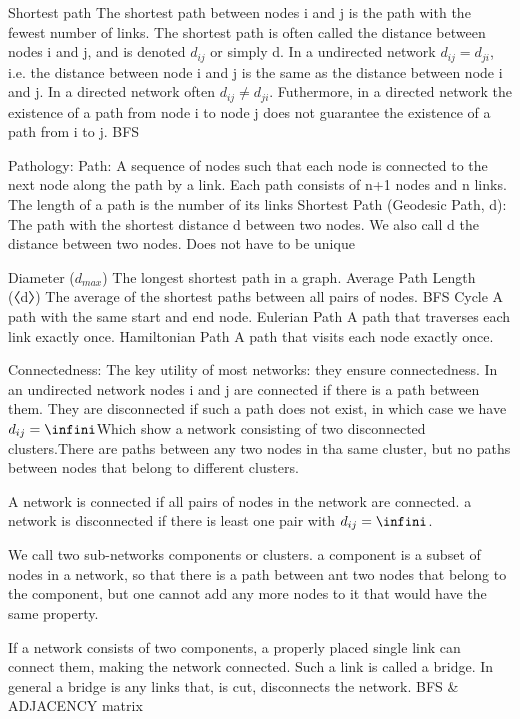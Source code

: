 Shortest path  
    The shortest path between nodes i and j is the path with the fewest number of links. The shortest path is often called the distance between nodes i and j, and is denoted $d_{ij}$ or simply d. 
    In a undirected network $d_{ij}=d_{ji}$, i.e. the distance between node i and j is the same as the distance between node i and j. In a directed network often $d_{ij} \neq d_{ji}$. Futhermore, in a directed network the existence of a path from node i to node j does not guarantee the existence of a path from i to j. BFS

Pathology: 
    Path: 
        A sequence of nodes such that each node is connected to the next node along the path by a link. Each path consists of n+1 nodes and n links. The length of a path is the number of its links
    Shortest Path (Geodesic Path, d):  
        The path with the shortest distance d between two nodes. We also call d the distance between two nodes. Does not have to be unique 
    
    Diameter ($d_{max}$)
        The longest shortest path in a graph.
    Average Path Length (〈d〉)
        The average of the shortest paths between all pairs of nodes. BFS 
    Cycle
        A path with the same start and end node. 
    Eulerian Path
        A path that traverses each link exactly once. 
    Hamiltonian Path
        A path that visits each node exactly once. 
        

Connectedness: 
    The key utility of most networks: they ensure connectedness. 
    In an undirected network nodes i and j are connected if there is a path between them. They are disconnected if such a path does not exist, in which case we have $d_{ij}=\infini $Which show a network consisting of two disconnected clusters.There are paths between any two nodes in tha same cluster, but no paths between nodes that belong to different clusters. 
    
    A network is connected if all pairs of nodes in the network are connected. a network is disconnected if there is least one pair with $d_{ij}= \infini $. 
    
    We call two sub-networks components or clusters. a component is a subset of nodes in a network, so that there is a path between ant two nodes that belong to the component, but one cannot add any more nodes to it that would have the same property. 
    
    If a network consists of two components, a properly placed single link can connect them, making the network connected. Such a link is called a bridge. In general a bridge is any links that, is cut, disconnects the network. BFS & ADJACENCY matrix 
    

